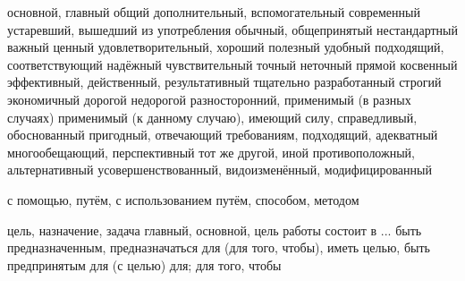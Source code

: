 	{основной, главный}
	{общий}
	{дополнительный, вспомогательный}
	{современный}
	{устаревший, вышедший из употребления}
	{обычный, общепринятый}
	{нестандартный}
	{важный}
	{ценный}
	{удовлетворительный, хороший}
	{полезный}
	{удобный}
	{подходящий, соответствующий}
	{надёжный}
	{чувствительный}
	{точный}
	{неточный}
	{прямой}
	{косвенный}
	{эффективный, действенный, результативный}
	{тщательно разработанный}
	{строгий}
	{экономичный}
	{дорогой}
	{недорогой}
	{разносторонний, применимый (в разных случаях)}
	{применимый (к данному случаю), имеющий силу, справедливый, обоснованный}
	{пригодный, отвечающий требованиям, подходящий, адекватный}
	{многообещающий, перспективный}
	{тот же}
	{другой, иной}
	{противоположный, альтернативный}
	{усовершенствованный, видоизменённый, модифицированный}

	{с помощью, путём, с использованием}
	{путём, способом, методом}


	{цель, назначение, задача}
	{главный, основной, }
	{цель работы состоит в ...}
	{быть предназначенным, предназначаться для (для того, чтобы), иметь целью, быть предпринятым 
	для (с целью)}
	{для; для того, чтобы}

